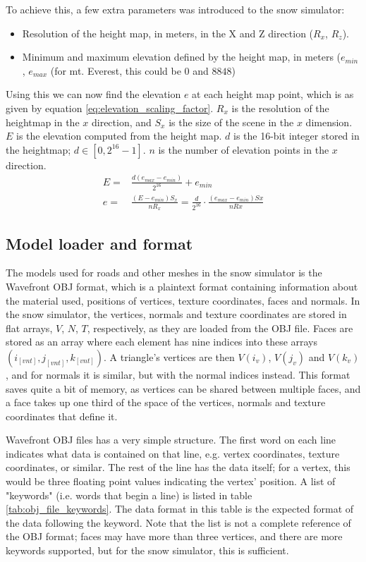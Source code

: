 To achieve this, a few extra parameters was introduced to the snow simulator:
\begin{itemize}
\item Resolution of the height map, in meters, in the X and Z direction ($R_x$, $R_z$).
\item Minimum and maximum elevation defined by the height map, in meters ($e_{min}$, $e_{max}$ (for mt. Everest, this could be $0$ and $8848$)
\end{itemize}
Using this we can now find the elevation $e$ at each height map point, which is as given by equation \ref{eq:elevation_scaling_factor}. $R_x$ is the resolution of the heightmap in the $x$ direction, and $S_x$ is the size of the scene in the $x$ dimension. $E$ is the elevation computed from the height map. $d$ is the 16-bit integer stored in the heightmap; $d\in [0,2^{16}-1]$. $n$ is the number of elevation points in the $x$ direction.
\begin{align}
E =& \frac{d(e_{max}-e_{min})}{2^{16}}+e_{min}\\
e =& \frac{(E-e_{min})S_x}{nR_x} = \frac{d}{2^{16}}\cdot \frac{(e_{max}-e_{min})Sx}{nRx} \label{eq:elevation_scaling_factor}
\end{align}

\subsection{Model loader and format}
The models used for roads and other meshes in the snow simulator is the Wavefront OBJ format, which is a plaintext format containing information about the material used, positions of vertices, texture coordinates, faces and normals. In the snow simulator, the vertices, normals and texture coordinates are stored in flat arrays, $V$, $N$, $T$, respectively, as they are loaded from the OBJ file. Faces are stored as an array where each element has nine indices into these arrays $(i_{[vnt]}, j_{[vnt]}, k_{[vnt]})$.  A triangle's vertices are then $V(i_v)$, $V(j_v)$ and $V(k_v)$, and for normals it is similar, but with the normal indices instead. This format saves quite a bit of memory, as vertices can be shared between multiple faces, and a face takes up one third of the space of the vertices, normals and texture coordinates that define it.

Wavefront OBJ files has a very simple structure. The first word on each line indicates what data is contained on that line, e.g. vertex coordinates, texture coordinates, or similar. The rest of the line has the data itself; for a vertex, this would be three floating point values indicating the vertex' position. A list of "keywords" (i.e. words that begin a line) is listed in table \ref{tab:obj_file_keywords}. The data format in this table is the expected format of the data following the keyword. Note that the list is not a complete reference of the OBJ format; faces may have more than three vertices, and there are more keywords supported, but for the snow simulator, this is sufficient.

